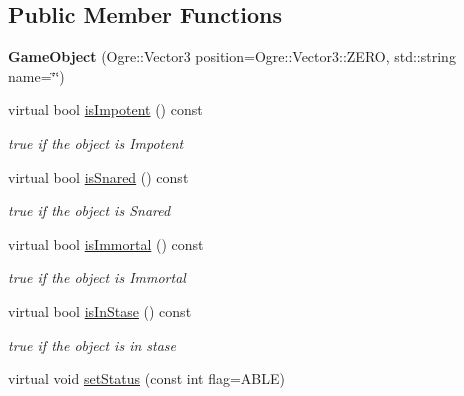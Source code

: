 \subsection*{Public Member Functions}
\begin{DoxyCompactItemize}
\item 
{\bfseries Game\+Object} (Ogre\+::\+Vector3 position=Ogre\+::\+Vector3\+::\+Z\+E\+RO, std\+::string name=\char`\"{}\char`\"{})\hypertarget{class_game_object_a09134330750f20921d72bb6d8cfcc241}{}\label{class_game_object_a09134330750f20921d72bb6d8cfcc241}

\item 
virtual bool \hyperlink{class_game_object_afd3df8ce4e4c1ea079816e4377b1a52a}{is\+Impotent} () const 
\begin{DoxyCompactList}\small\item\em true if the object is Impotent \end{DoxyCompactList}\item 
virtual bool \hyperlink{class_game_object_a29cd81ee9c54c56d5a251d63e3f8a1f7}{is\+Snared} () const 
\begin{DoxyCompactList}\small\item\em true if the object is Snared \end{DoxyCompactList}\item 
virtual bool \hyperlink{class_game_object_a1e28bfe5d5643b72597d979bc7404e53}{is\+Immortal} () const 
\begin{DoxyCompactList}\small\item\em true if the object is Immortal \end{DoxyCompactList}\item 
virtual bool \hyperlink{class_game_object_a7388f9c01ffd7239f2e844174a00cc84}{is\+In\+Stase} () const 
\begin{DoxyCompactList}\small\item\em true if the object is in stase \end{DoxyCompactList}\item 
virtual void \hyperlink{class_game_object_aa477bba2bc2d8ed47a0f271ebf2f0059}{set\+Status} (const int flag=A\+B\+LE)\hypertarget{class_game_object_aa477bba2bc2d8ed47a0f271ebf2f0059}{}\label{class_game_object_aa477bba2bc2d8ed47a0f271ebf2f0059}


\end{DoxyCompactItemize}
